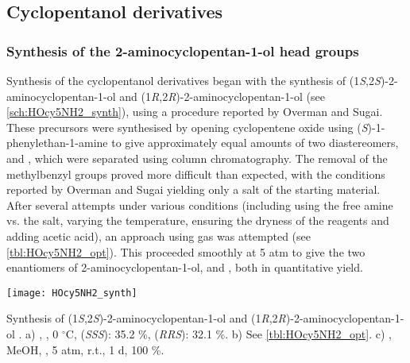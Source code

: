 \subsection{Cyclopentanol derivatives}

\subsubsection{Synthesis of the 2-aminocyclopentan-1-ol head groups\label{sec:HOcy5NH2}}

Synthesis of the cyclopentanol derivatives began with the synthesis of (1\textit{S},2\textit{S})-2-aminocyclopentan-1-ol  and (1\textit{R},2\textit{R})-2-aminocyclopentan-1-ol  (see \ref{sch:HOcy5NH2_synth}), using a procedure reported by Overman and Sugai\cite{Aube1992,Overman1985,Overman1985a}.
These precursors were synthesised by opening cyclopentene oxide  using (\textit{S})-1-phenylethan-1-amine  to give approximately equal amounts of two diastereomers,  and , which were separated using column chromatography. 
The removal of the methylbenzyl groups proved more difficult than expected, with the conditions reported by Overman and Sugai\cite{Overman1985} yielding only a salt of the starting material.
After several attempts under various conditions (including using the free amine vs. the salt, varying the temperature, ensuring the dryness of the reagents and adding acetic acid), an approach using  gas was attempted (see \ref{tbl:HOcy5NH2_opt}). This proceeded smoothly at 5 atm to give the two enantiomers of 2-aminocyclopentan-1-ol,  and , both in quantitative yield.

\begin{scheme}[H]
	\begin{center}
		\texttt{[image: HOcy5NH2\_synth]}
		\caption{Synthesis of (1\textit{S},2\textit{S})-2-aminocyclopentan-1-ol  and (1\textit{R},2\textit{R})-2-aminocyclopentan-1-ol .
		a) , , 0 $^\circ$C,  
		 (\textit{SSS}): 35.2 \%,
		 (\textit{RRS}): 32.1 \%.
		b) See \ref{tbl:HOcy5NH2_opt}.
		c) , MeOH, , 5 atm, r.t., 1 d, 100 \%.
		\label{sch:HOcy5NH2_synth}}
	\end{center}
\end{scheme}


